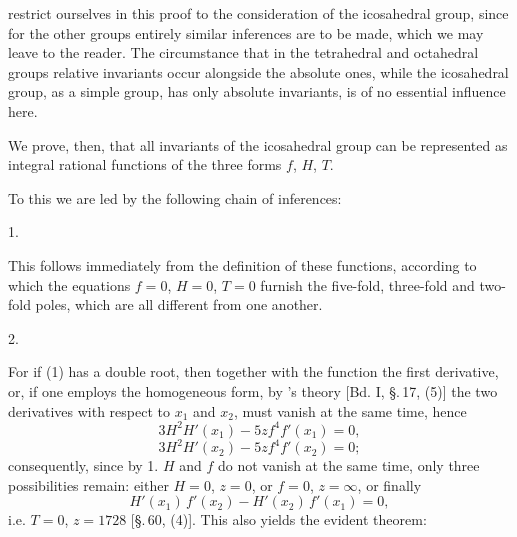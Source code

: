 restrict ourselves in this proof to the consideration of the icosahedral group, since for the other groups entirely similar inferences are to be made, which we may leave to the reader. The circumstance that in the tetrahedral and octahedral groups relative invariants occur alongside the absolute ones, while the icosahedral group, as a simple group, has only absolute invariants, is of no essential influence here.

We prove, then, that all invariants of the icosahedral group can be represented as integral rational functions of the three forms $f$, $H$, $T$.

To this we are led by the following chain of inferences:

1. 

This follows immediately from the definition of these functions, according to which the equations $f = 0$, $H = 0$, $T = 0$ furnish the five-fold, three-fold and two-fold poles, which are all different from one another.

2. 

For if (1) has a double root, then together with the function the first derivative, or, if one employs the homogeneous form, by 's theory [Bd. I, \S.\,17, (5)] the two derivatives with respect to $x_1$ and $x_2$, must vanish at the same time, hence
\[
3H^2 H'(x_1) - 5z f^4 f'(x_1) = 0,
\]
\[
3H^2 H'(x_2) - 5z f^4 f'(x_2) = 0;
\]
consequently, since by 1. $H$ and $f$ do not vanish at the same time, only three possibilities remain: either $H = 0$, $z = 0$, or $f = 0$, $z = \infty$, or finally
\[
H'(x_1)\,f'(x_2) - H'(x_2)\,f'(x_1) = 0,
\]
i.e. $T = 0$, $z = 1728$ [\S.\,60, (4)]. This also yields the evident theorem:
